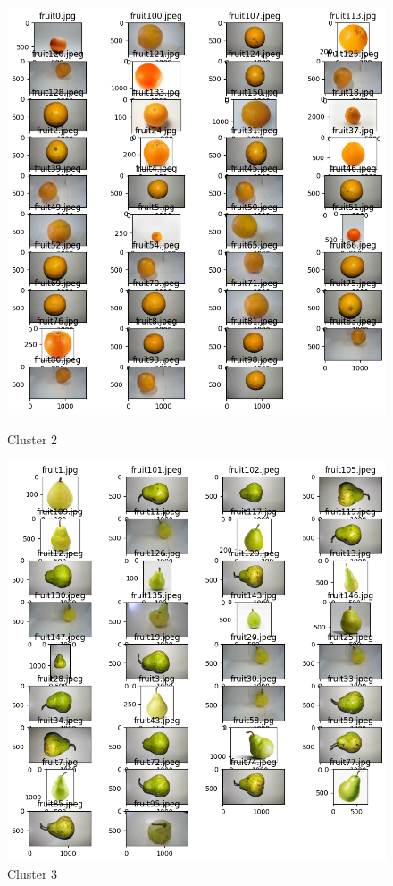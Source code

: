 \documentclass[a4paper, 12pt]{article}
\begin{document}
\begin{figure}[!htbp]
    \begin{minipage}[t]{0.5\textwidth}
        \centering
        \includegraphics[width=0.8\linewidth]{cluster2.png}
        \caption{Cluster 2}
        \label{cluster2}
    \end{minipage}%
    \begin{minipage}[t]{0.5\textwidth}
        \centering
        \includegraphics[width=0.8\linewidth]{cluster3.png}
        \caption{Cluster 3}
        \label{cluster3}
    \end{minipage}
\end{figure}
\end{document}
